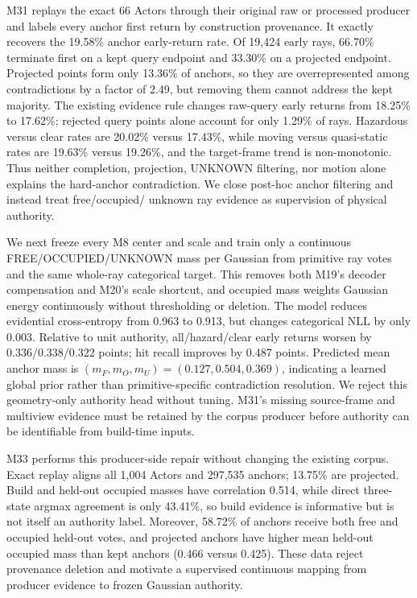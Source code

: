 M31 replays the exact 66 Actors through their original raw or processed producer and labels every anchor first return by
construction provenance. It exactly recovers the 19.58\% anchor early-return rate. Of 19,424 early rays, 66.70\% terminate
first on a kept query endpoint and 33.30\% on a projected endpoint. Projected points form only 13.36\% of anchors, so they
are overrepresented among contradictions by a factor of 2.49, but removing them cannot address the kept majority. The
existing evidence rule changes raw-query early returns from 18.25\% to 17.62\%; rejected query points alone account for only
1.29\% of rays. Hazardous versus clear rates are 20.02\% versus 17.43\%, while moving versus quasi-static rates are
19.63\% versus 19.26\%, and the target-frame trend is non-monotonic. Thus neither completion, projection, UNKNOWN filtering,
nor motion alone explains the hard-anchor contradiction. We close post-hoc anchor filtering and instead treat free/occupied/
unknown ray evidence as supervision of physical authority.

We next freeze every M8 center and scale and train only a continuous FREE/OCCUPIED/UNKNOWN mass per Gaussian from primitive
ray votes and the same whole-ray categorical target. This removes both M19's decoder compensation and M20's scale shortcut,
and occupied mass weights Gaussian energy continuously without thresholding or deletion. The model reduces evidential
cross-entropy from 0.963 to 0.913, but changes categorical NLL by only 0.003. Relative to unit authority, all/hazard/clear
early returns worsen by 0.336/0.338/0.322 points; hit recall improves by 0.487 points. Predicted mean anchor mass is
$(m_F,m_O,m_U)=(0.127,0.504,0.369)$, indicating a learned global prior rather than primitive-specific contradiction
resolution. We reject this geometry-only authority head without tuning. M31's missing source-frame and multiview evidence
must be retained by the corpus producer before authority can be identifiable from build-time inputs.

M33 performs this producer-side repair without changing the existing corpus. Exact replay aligns all 1,004 Actors and
297,535 anchors; 13.75\% are projected. Build and held-out occupied masses have correlation 0.514, while direct
three-state argmax agreement is only 43.41\%, so build evidence is informative but is not itself an authority label.
Moreover, 58.72\% of anchors receive both free and occupied held-out votes, and projected anchors have higher mean
held-out occupied mass than kept anchors (0.466 versus 0.425). These data reject provenance deletion and motivate a
supervised continuous mapping from producer evidence to frozen Gaussian authority.

